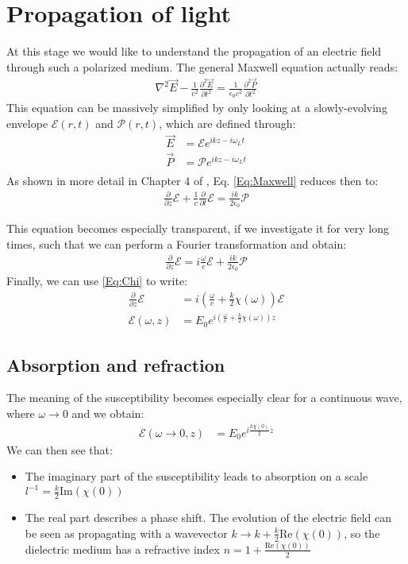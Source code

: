 \documentclass[10pt]{article}
\let\cite\citep
\providecommand\citep{\cite}
\begin{document}
\section{Propagation of light}
At this stage we would like to understand the propagation of an electric field through such a polarized medium. The general Maxwell equation actually reads:
\begin{align}\label{Eq:Maxwell}
\nabla^2 \vec{E}-\frac{1}{c^2}\frac{\partial^2 \vec{E}}{\partial t^2}= \frac{1}{\epsilon_0 c^2}\frac{\partial^2 \vec{P}}{\partial t^2}
\end{align}
This equation can be massively simplified by only looking at a slowly-evolving envelope $\mathcal{E}(r,t)$ and $\mathcal{P}(r,t)$, which are defined through:
\begin{align}
\vec{E} &= \mathcal{E} e^{ikz-i \omega_L t}\\
\vec{P} &= \mathcal{P} e^{ikz-i \omega_L t}\\
\end{align}
As shown in more detail in Chapter 4 of \cite{lukin}, Eq. \eqref{Eq:Maxwell} reduces then to:
\begin{align}
\frac{\partial}{\partial z}\mathcal{E}+\frac{1}{c}\frac{\partial}{\partial t}\mathcal{E} = \frac{ik}{2\epsilon_0}\mathcal{P}
\end{align}

This equation becomes especially transparent, if we investigate it for very long times, such that we can perform a Fourier transformation and obtain:
\begin{align}
\frac{\partial}{\partial z}\mathcal{E}= i\frac{\omega}{c}\mathcal{E} +\frac{ik}{2\epsilon_0}\mathcal{P}
\end{align}
Finally, we can use \eqref{Eq:Chi} to write: 
\begin{align}
\frac{\partial}{\partial z}\mathcal{E}&= i\left(\frac{\omega}{c} +\frac{k}{2} \chi(\omega)\right) \mathcal{E}\\
\mathcal{E}(\omega, z) &=E_0 e^{i\left(\frac{\omega}{c} +\frac{k}{2}\chi(\omega)\right)z} 
\end{align}

\subsection{Absorption and refraction}

The meaning of the susceptibility becomes especially clear for a continuous wave, where $\omega\rightarrow 0$ and we obtain:
\begin{align}
\mathcal{E}(\omega\rightarrow 0, z) &=E_0 e^{i\frac{k\chi(0)}{2} z}
\end{align}
We can then see that:
\begin{itemize}
\item The imaginary part of the susceptibility leads to absorption on a scale $l^{-1} = \frac{k}{2}\text{Im}(\chi(0))$
\item The real part describes a phase shift. The evolution of the electric field can be seen as propagating with a wavevector $k \rightarrow k +\frac{k}{2}\text{Re}(\chi(0))$, so the dielectric medium has a refractive index $n = 1 + \frac{\text{Re}(\chi(0))}{2}$
\end{itemize}
\end{document}
